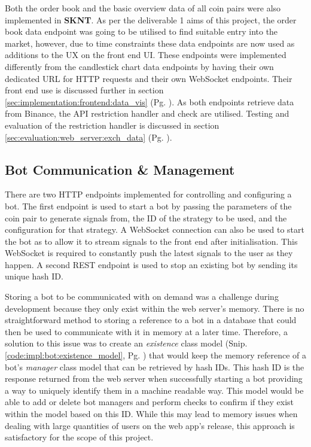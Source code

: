 Both the order book and the basic overview data of all coin pairs were also implemented in \textbf{SKNT}. As per the deliverable 1 aims of this project, the order book data endpoint was going to be utilised to find suitable entry into the market, however, due to time constraints these data endpoints are now used as additions to the UX on the front end UI. These endpoints were implemented differently from the candlestick chart data endpoints by having their own dedicated URL for HTTP requests and their own WebSocket endpoints. Their front end use is discussed further in section \ref{sec:implementation:frontend:data_vis} (Pg. \pageref{sec:implementation:frontend:data_vis}). As both endpoints retrieve data from Binance, the API restriction handler and check are utilised. Testing and evaluation of the restriction handler is discussed in section \ref{sec:evaluation:web_server:exch_data} (Pg. \pageref{sec:evaluation:web_server:exch_data}).

\subsection{Bot Communication \& Management}
\label{sec:implementation:info_comm:bot_comm_management}

\noindent There are two HTTP endpoints implemented for controlling and configuring a bot. The first endpoint is used to start a bot by passing the parameters of the coin pair to generate signals from, the ID of the strategy to be used, and the configuration for that strategy. A WebSocket connection can also be used to start the bot as to allow it to stream signals to the front end after initialisation. This WebSocket is required to constantly push the latest signals to the user as they happen. A second REST endpoint is used to stop an existing bot by sending its unique hash ID.

Storing a bot to be communicated with on demand was a challenge during development because they only exist within the web server's memory. There is no straightforward method to storing a reference to a bot in a database that could then be used to communicate with it in memory at a later time. Therefore, a solution to this issue was to create an \textit{existence} class model (Snip. \ref{code:impl:bot:existence_model}, Pg. \pageref{code:impl:bot:existence_model}) that would keep the memory reference of a bot's \textit{manager} class model that can be retrieved by hash IDs. This hash ID is the response returned from the web server when successfully starting a bot providing a way to uniquely identify them in a machine readable way. This model would be able to add or delete bot managers and perform checks to confirm if they exist within the model based on this ID. While this may lead to memory issues when dealing with large quantities of users on the web app's release, this approach is satisfactory for the scope of this project. 

